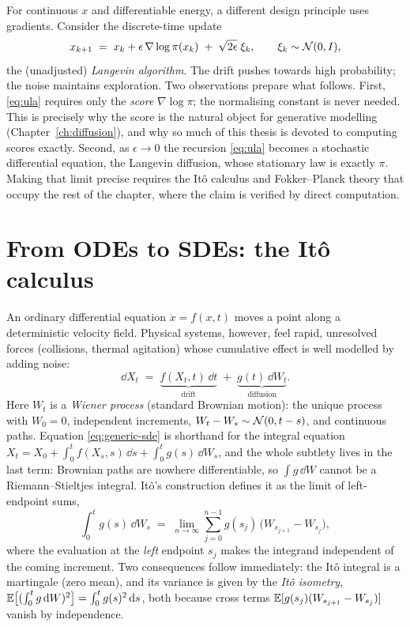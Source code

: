 For continuous $x$ and differentiable energy, a different design
principle uses gradients. Consider the discrete-time update
\begin{equation}
  x_{k+1} \;=\; x_k + \epsilon\, \nabla \log \pi(x_k)
  \;+\; \sqrt{2\epsilon}\; \xi_k ,
  \qquad \xi_k \sim \mathcal{N}(0, I),
  \label{eq:ula}
\end{equation}
the (unadjusted) \emph{Langevin algorithm}. The drift pushes towards high
probability; the noise maintains exploration. Two observations prepare
what follows. First, \eqref{eq:ula} requires only the \emph{score}
$\nabla \log \pi$; the normalising constant is never needed. This is
precisely why the score is the natural object for generative modelling
(Chapter~\ref{ch:diffusion}), and why so much of this thesis is devoted
to computing scores exactly. Second, as $\epsilon \to 0$ the recursion
\eqref{eq:ula} becomes a stochastic differential equation, the Langevin
diffusion, whose stationary law is exactly $\pi$. Making that limit
precise requires the It\^o calculus and Fokker--Planck theory that occupy
the rest of the chapter, where the claim is verified by direct
computation.

\section{From ODEs to SDEs: the It\^o calculus}\label{sec:ode-to-sde}

An ordinary differential equation $\dot x = f(x, t)$ moves a point along
a deterministic velocity field. Physical systems, however, feel rapid,
unresolved forces (collisions, thermal agitation) whose cumulative effect
is well modelled by adding noise:
\begin{equation}
  \dd X_t \;=\; \underbrace{f(X_t, t)\,\dd t}_{\text{drift}}
  \;+\; \underbrace{g(t)\,\dd W_t}_{\text{diffusion}} .
  \label{eq:generic-sde}
\end{equation}
Here $W_t$ is a \emph{Wiener process} (standard Brownian motion): the
unique process with $W_0 = 0$, independent increments,
$W_t - W_s \sim \mathcal{N}(0, t-s)$, and continuous paths. Equation
\eqref{eq:generic-sde} is shorthand for the integral equation
$X_t = X_0 + \int_0^t f(X_s, s)\,\dd s + \int_0^t g(s)\,\dd W_s$, and the
whole subtlety lives in the last term: Brownian paths are nowhere
differentiable, so $\int g\,\dd W$ cannot be a Riemann--Stieltjes
integral. It\^o's construction \citep{ito1944stochastic} defines it as
the limit of left-endpoint sums,
\begin{equation}
  \int_0^t g(s)\, \dd W_s
  \;=\; \lim_{n \to \infty} \sum_{j=0}^{n-1}
        g(s_j)\,\big( W_{s_{j+1}} - W_{s_j} \big),
  \label{eq:ito-integral}
\end{equation}
where the evaluation at the \emph{left} endpoint $s_j$ makes the
integrand independent of the coming increment. Two consequences follow
immediately: the It\^o integral is a martingale (zero mean), and its
variance is given by the \emph{It\^o isometry},
$\mathbb{E}\big[ (\int_0^t g\,\mathrm{d} W)^2 \big] = \int_0^t g(s)^2\,\mathrm{d} s$, both
because cross terms $\mathbb{E}[g(s_j)(W_{s_{j+1}}-W_{s_j})]$ vanish by
independence.

